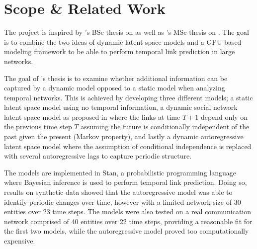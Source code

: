     
    

\section{Scope \& Related Work}

    The project is inspired by \citeauthor{zangenberg2018a}'s BSc thesis \cite{zangenberg2018a} on  as well as \citeauthor{jacobsen2018a}'s MSc thesis \cite{jacobsen2018a} on . 
    The goal is to combine the two ideas of dynamic latent space models and a GPU-based modeling framework to be able to perform temporal link prediction in large networks.

    The goal of \citeauthor{zangenberg2018a}'s thesis is to examine whether additional information can be captured by a dynamic model opposed to a static model when analyzing temporal networks. This is achieved by developing three different models; a static latent space model using no temporal information, a dynamic social network latent space model as proposed in \cite{sarkar2005dynamic} where the links at time $T+1$ depend only on the previous time step $T$ assuming the future is conditionally independent of the past given the present (Markov property), and lastly a dynamic autoregressive latent space model where the assumption of conditional independence is replaced with several autoregressive lags to capture periodic structure.
    
    The models are implemented in Stan, a probabilistic programming language where Bayesian inference is used to perform temporal link prediction. Doing so, results on synthetic data showed that the autoregressive model was able to identify periodic changes over time, however with a limited network size of 30 entities over 23 time steps. The models were also tested on a real communication network comprised of 40 entities over 22 time steps, providing a reasonable fit for the first two models, while the autoregressive model proved too computationally expensive. 
    
